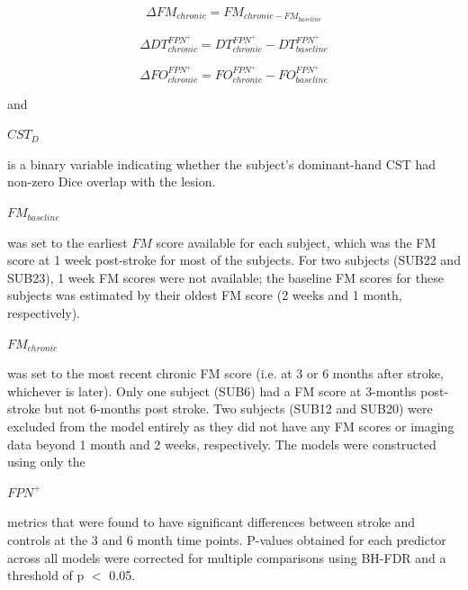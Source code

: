 \documentclass[phd,tocprelim]{cornell}
\begin{document}
	 \begin{Large}
	\begin{center}

	\begin{equation}
	    \Delta FM_{chronic}  = FM_{chronic - FM_{baseline}} 
	\end{equation}

	\begin{equation}
	    \Delta DT^{FPN^+}_{chronic}  = DT^{FPN^+}_{chronic}-DT^{FPN^+}_{baseline} 
	\end{equation}

	\begin{equation}
	    \Delta FO^{FPN^+}_{chronic}  = FO^{FPN^+}_{chronic}-FO^{FPN^+}_{baseline} 
	\end{equation}
	\end{center}
\end{Large}
	and \begin{Large}$CST_D$\end{Large} is a binary variable indicating whether the subject's dominant-hand CST had non-zero Dice overlap with the lesion.  \begin{Large}$FM_{baseline}$\end{Large} was set to the earliest $FM$ score available for each subject, which was the FM score at 1 week post-stroke for most of the subjects. For two subjects (SUB22 and SUB23), 1 week FM scores were not available; the baseline FM scores for these subjects was estimated by their oldest FM score (2 weeks and 1 month, respectively).  \begin{Large}$FM_{chronic}$\end{Large} was set to the most recent chronic FM score (i.e. at 3 or 6 months after stroke, whichever is later). Only one subject (SUB6) had a FM score at 3-months post-stroke but not 6-months post stroke. Two subjects (SUB12 and SUB20) were excluded from the model entirely as they did not have any FM scores or imaging data beyond 1 month and 2 weeks, respectively. The models were constructed using only the \begin{Large}$FPN^+$\end{Large} metrics that were found to have significant differences between stroke and controls at the 3 and 6 month time points. P-values obtained for each predictor across all models were corrected for multiple comparisons using BH-FDR and a threshold of p $<$ 0.05.
	
\end{document}
